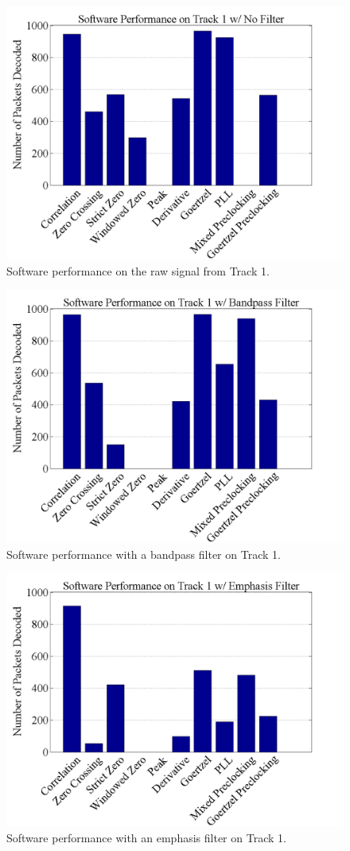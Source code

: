 \begin{figure}
  \centering
	\includegraphics[width=0.75\linewidth]{images/SoftwarePerformanceonTrack1wNoFilter.png} 
	\caption{Software performance on the raw signal from Track 1.}
   \label{T1FiltNo}
\end{figure}
\begin{figure}
  \centering
	\includegraphics[width=0.75\linewidth]{images/SoftwarePerformanceonTrack1wBandpassFilter.png} 
	\caption{Software performance with a bandpass filter on Track 1.}
   \label{T1Filt0}
\end{figure}
\begin{figure}
  \centering
	\includegraphics[width=0.75\linewidth]{images/SoftwarePerformanceonTrack1wEmphasisFilter.png} 
	\caption{Software performance with an emphasis filter on Track 1.}
   \label{T1Filt6}
\end{figure}
